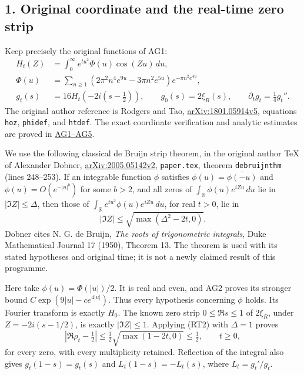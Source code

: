 \documentclass[
  10pt,
  a4paper,
]{article}
\begin{document}
\subsection{1. Original coordinate and the real-time zero
strip}\label{original-coordinate-and-the-real-time-zero-strip}

Keep precisely the original functions of AG1: \[
\begin{aligned}
H_t(Z)&=\int_0^\infty e^{tu^2}\Phi(u)\cos(Zu)\,du,\\
\Phi(u)&=\sum_{n\ge1}(2\pi^2n^4e^{9u}-3\pi n^2e^{5u})e^{-\pi n^2e^{4u}},\\
g_t(s)&=16H_t(-2i(s-\tfrac12)),\qquad
g_0(s)=2\xi_R(s),\qquad \partial_tg_t=\tfrac14g_t''.
\end{aligned}\tag{RT1}
\] The original author reference is Rodgers and Tao,
\href{https://arxiv.org/src/1801.05914v5}{arXiv:1801.05914v5}, equations
\texttt{hoz}, \texttt{phidef}, and \texttt{htdef}. The exact coordinate
verification and analytic estimates are proved in
\href{ACTUAL_HEAT_ZERO_DISTRIBUTION_VARIATION.md}{AG1--AG5}.

We use the following classical de Bruijn strip theorem, in the original
author TeX of Alexander Dobner,
\href{https://arxiv.org/src/2005.05142v2}{arXiv:2005.05142v2},
\texttt{paper.\allowbreak{}tex}, theorem \texttt{debruijnthm} (lines 248--253). If an
integrable function \(\phi\) satisfies \(\phi(u)=\overline{\phi(-u)}\)
and \(\phi(u)=O(e^{-|u|^b})\) for some \(b>2\), and all zeros of
\(\int_{\mathbb R}\phi(u)e^{iZu}\,du\) lie in \(|\Im Z|\le\Delta\), then
those of \(\int_{\mathbb R}e^{tu^2}\phi(u)e^{iZu}\,du\), for real
\(t>0\), lie in \[
|\Im Z|\le\sqrt{\max(\Delta^2-2t,0)}.
\tag{RT2}
\] Dobner cites N. G. de Bruijn, \emph{The roots of trigonometric
integrals}, Duke Mathematical Journal 17 (1950), Theorem 13. The theorem
is used with its stated hypotheses and original time; it is not a newly
claimed result of this programme.

Here take \(\phi(u)=\Phi(|u|)/2\). It is real and even, and AG2 proves
its stronger bound \(C\exp(9|u|-c e^{4|u|})\). Thus every hypothesis
concerning \(\phi\) holds. Its Fourier transform is exactly \(H_0\). The
known zero strip \(0\le\Re s\le1\) of \(2\xi_R\), under
\(Z=-2i(s-1/2)\), is exactly \(|\Im Z|\le1\). Applying (RT2) with
\(\Delta=1\) proves \[
|\Re\rho_t-\tfrac12|\le
\tfrac12\sqrt{\max(1-2t,0)}\le\tfrac12,
\qquad t\ge0,
\tag{RT3}
\] for every zero, with every multiplicity retained. Reflection of the
integral also gives \(g_t(1-s)=g_t(s)\) and \(L_t(1-s)=-L_t(s)\), where
\(L_t=g_t'/g_t\).
\end{document}
